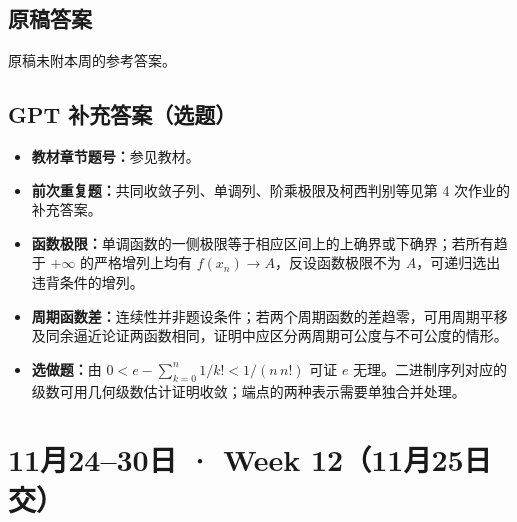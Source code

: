 \documentclass[UTF8,11pt, a4paper, oneside, fontset=none]{ctexbook}
\begin{document}
\subsection*{原稿答案}
\noindent 原稿未附本周的参考答案。
\clearpage
\subsection*{GPT 补充答案（选题）}
\begin{itemize}
\item \textbf{教材章节题号：}参见教材。
\item \textbf{前次重复题：}共同收敛子列、单调列、阶乘极限及柯西判别等见第 4 次作业的补充答案。
\item \textbf{函数极限：}单调函数的一侧极限等于相应区间上的上确界或下确界；若所有趋于 $+\infty$ 的严格增列上均有 $f(x_n)\to A$，反设函数极限不为 $A$，可递归选出违背条件的增列。
\item \textbf{周期函数差：}连续性并非题设条件；若两个周期函数的差趋零，可用周期平移及同余逼近论证两函数相同，证明中应区分两周期可公度与不可公度的情形。
\item \textbf{选做题：}由 $0<e-\sum_{k=0}^n1/k!<1/(n\,n!)$ 可证 $e$ 无理。二进制序列对应的级数可用几何级数估计证明收敛；端点的两种表示需要单独合并处理。
\end{itemize}
\clearpage
\section{11月24--30日 · Week 12（11月25日交）}
\end{document}
